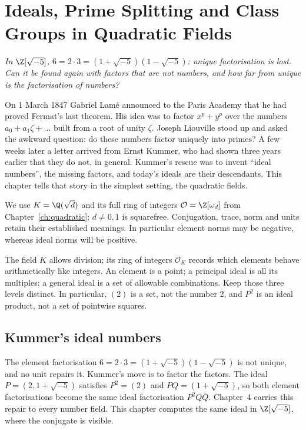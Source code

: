 \chapter{Ideals, Prime Splitting and Class Groups in Quadratic Fields}\label{ch:ideals}

\begin{center}\itshape
In $\Z[\sqrt{-5}]$, $6=2\cdot3=(1+\sqrt{-5})(1-\sqrt{-5})$: unique factorisation is lost.\\
Can it be found again with factors that are not numbers, and how far from unique is the factorisation of numbers?
\end{center}

On 1 March 1847 Gabriel Lam\'e announced to the Paris Academy that he had proved Fermat's last theorem. His idea was to factor $x^p+y^p$ over the
numbers $a_0+a_1\zeta+\dots$ built from a root of unity $\zeta$. Joseph Liouville stood up and asked the awkward question: do these numbers factor uniquely
into primes? A few weeks later a letter arrived from Ernst Kummer, who had shown three years earlier that they do not, in general. Kummer's rescue was to
invent ``ideal numbers'', the missing factors, and today's ideals are their descendants. This chapter tells that story in the simplest setting, the
quadratic fields.

We use $K=\Q(\sqrt d)$ and its full ring of integers
$\mathcal O=\Z[\omega_d]$ from Chapter~\ref{ch:quadratic};
$d\ne0,1$ is squarefree. Conjugation, trace, norm and units
retain their established meanings. In particular element norms may be
negative, whereas ideal norms will be positive.

\begin{reminder}
The field $K$ allows division; its ring of integers $\mathcal O_K$ records which
elements behave arithmetically like integers. An element is a point; a principal
ideal is all its multiples; a general ideal is a set of allowable combinations.
Keep those three levels distinct. In particular, $(2)$ is a set, not the number
$2$, and $P^2$ is an ideal product, not a set of pointwise squares.
\end{reminder}

\section{Kummer's ideal numbers}

The element factorisation $6=2\cdot 3=(1+\sqrt{-5})(1-\sqrt{-5})$ is not unique, and no unit repairs it. Kummer's move is to factor the factors. The ideal $P=(2,1+\sqrt{-5})$ satisfies $P^2=(2)$ and $PQ=(1+\sqrt{-5})$, so both element factorisations become the same ideal factorisation $P^2Q\bar Q$. Chapter~4 carries this repair to every number field. This chapter computes the same ideal in $\Z[\sqrt{-5}]$, where the conjugate is visible.


